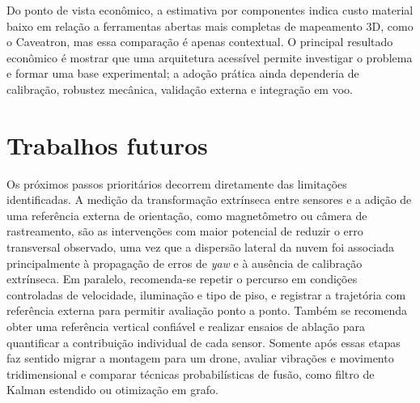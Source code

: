 Do ponto de vista econômico, a estimativa por componentes indica custo material
baixo em relação a ferramentas abertas mais completas de mapeamento 3D, como o
Caveatron, mas essa comparação é apenas contextual. O principal resultado
econômico é mostrar que uma arquitetura acessível permite investigar o problema
e formar uma base experimental; a adoção prática ainda dependeria de
calibração, robustez mecânica, validação externa e integração em voo.

\section{Trabalhos futuros}
\label{sec:trabalhos_futuros}

Os próximos passos prioritários decorrem diretamente das limitações
identificadas. A medição da transformação extrínseca entre sensores e a
adição de uma referência externa de orientação, como magnetômetro ou
câmera de rastreamento, são as intervenções com maior potencial de reduzir
o erro transversal observado, uma vez que a dispersão lateral da nuvem foi
associada principalmente à propagação de erros de \textit{yaw} e à ausência
de calibração extrínseca. Em paralelo, recomenda-se repetir o percurso em
condições controladas de velocidade, iluminação e tipo de piso, e registrar
a trajetória com referência externa para permitir avaliação ponto a ponto.
Também se recomenda obter uma referência vertical confiável e realizar ensaios
de ablação para quantificar a contribuição individual de cada sensor. Somente
após essas etapas faz sentido migrar a montagem para um drone, avaliar
vibrações e movimento tridimensional e comparar técnicas probabilísticas de
fusão, como filtro de Kalman estendido ou otimização em grafo.
